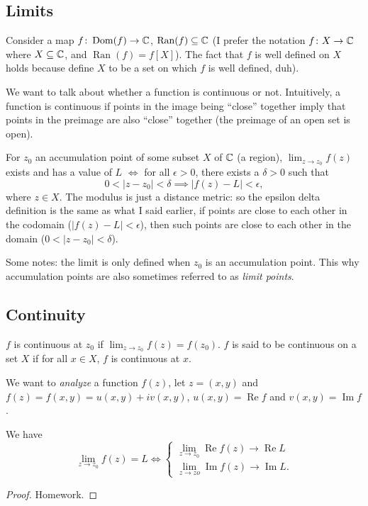 \subsection{Limits}
Consider a map $f \colon \operatorname{Dom}(f) \to \mathbb{C}$, $\operatorname{Ran}(f)\subseteq \mathbb{C}$ (I prefer the notation $f \colon X \to \mathbb{C}$ where $X \subseteq \mathbb{C}$, and $\operatorname{Ran}(f)=f[X]$). The fact that $f$ is well defined on $X$ holds because define $X$ to be a set on which $f$ is well defined, duh).

We want to talk about whether a function is continuous or not. Intuitively, a function is continuous if points in the image being ``close'' together imply that points in the preimage are also ``close'' together (the preimage of an open set is open).
\begin{definition}
    For $z_0$ an accumulation point of some subset $X$ of $\mathbb{C}$ (a region), $\lim_{z\to z_0}f(z)$ exists and has a value of $L$ $\iff$ for all $\epsilon>0$, there exists a $\delta >0$ such that \[
        0<|z-z_0|<\delta \implies |f(z)-L|<\epsilon,
    \] where $z\in X$. The modulus is just a distance metric: so the epsilon delta definition is the same as what I said earlier, if points are close to each other in the codomain ($|f(z)-L|<\epsilon$), then such points are close to each other in the domain ($0<|z-z_0|<\delta$).
\end{definition}
Some notes: the limit is only defined when $z_0$ is an accumulation point. This why accumulation points are also sometimes referred to as \emph{limit points}.

\subsection{Continuity}
\begin{definition}[Continuity]
    $f$ is continuous at $z_0$ if $\lim_{z\to z_0}f(z)=f(z_0)$. $f$ is said to be continuous on a set $X$ if for all $x\in X$, $f$ is continuous at $x$.
\end{definition}
We want to \emph{analyze} a function $f(z)$, let $z=(x,y)$ and $f(z)=f(x,y)=u(x,y)+iv(x,y)$, $u(x,y)=\operatorname{Re}f$ and $v(x,y)=\operatorname{Im}f$.
\begin{theorem}
    We have \[
        \lim_{z\to z_0}f(z)=L \iff
        \begin{cases}
            \lim_{z\to z_0}\operatorname{Re}f(z) \to \operatorname{Re}L\\
            \lim_{z\to zo}\operatorname{Im}f(z) \to \operatorname{Im}L.
        \end{cases}
    \]
\end{theorem}
\begin{proof}
    Homework.
\end{proof}


